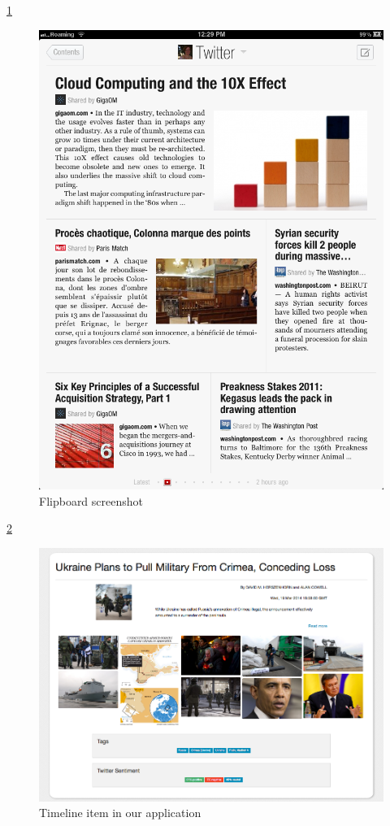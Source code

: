 \documentclass{acm_proc_10ptArticle-sp}
\begin{document}
\ref{screenshot:flipboard}
\begin{figure}[H]
  \centering
  \includegraphics[width=0.9\linewidth]{img/flipboard-screenshot.png}
  \caption{Flipboard screenshot}
  \label{screenshot:flipboard}
\end{figure}

\ref{screenshot:timeline}
\begin{figure}[H]
  \centering
  \includegraphics[width=0.9\linewidth]{img/timeline-item.png}
  \caption{Timeline item in our application}
  \label{screenshot:timeline}
\end{figure}
\end{document}
